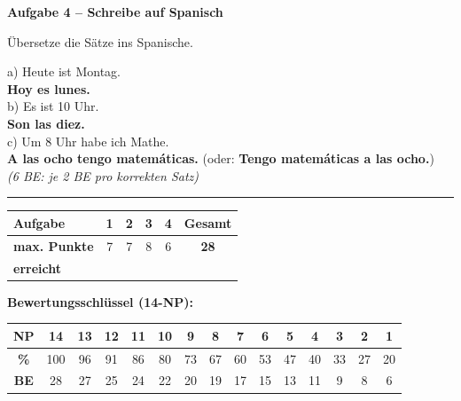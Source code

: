 \documentclass[11pt, a4paper]{article}
\newcommand{\fachfarbe}{spanisch}
\newcommand{\punktebox}[1]{\hfill\fbox{\small \_\_\_/#1}}
\newcommand{\lsg}[1]{\textcolor{loesung}{\textbf{#1}}}
\newenvironment{aufgabe}[1]{%
    \vspace{12pt}
    \noindent\textbf{\textcolor{\fachfarbe}{Aufgabe #1}}
    \vspace{6pt}
    \begin{list}{}{\leftmargin=0pt}
    \item[]
}{%
    \end{list}
}
\begin{document}
\vspace{15pt}


\begin{aufgabe}{4 -- Schreibe auf Spanisch}
Übersetze die Sätze ins Spanische. \punktebox{6}
\end{aufgabe}

\noindent
a) Heute ist Montag. \\[0.5em]
\lsg{Hoy es lunes.} \\[1em]

\noindent
b) Es ist 10 Uhr. \\[0.5em]
\lsg{Son las diez.} \\[1em]

\noindent
c) Um 8 Uhr habe ich Mathe. \\[0.5em]
\lsg{A las ocho tengo matemáticas.} (oder: \lsg{Tengo matemáticas a las ocho.}) \\

\textcolor{loesung}{\textit{(6 BE: je 2 BE pro korrekten Satz)}}


\vspace{20pt}
\hrule
\vspace{10pt}

\noindent
\begin{tabularx}{\textwidth}{|X|c|c|c|c||c|}
\hline
\textbf{Aufgabe} & 1 & 2 & 3 & 4 & \textbf{Gesamt} \\
\hline
\textbf{max. Punkte} & 7 & 7 & 8 & 6 & \textbf{28} \\
\hline
\textbf{erreicht} & & & & & \\[0.8em]
\hline
\end{tabularx}

\vspace{15pt}

\noindent\textbf{Bewertungsschlüssel (14-NP):}

\begin{center}
\begin{tabular}{|c|c|c|c|c|c|c|c|c|c|c|c|c|c|c|}
\hline
\textbf{NP} & 14 & 13 & 12 & 11 & 10 & 9 & 8 & 7 & 6 & 5 & 4 & 3 & 2 & 1 \\
\hline
\textbf{\%} & 100 & 96 & 91 & 86 & 80 & 73 & 67 & 60 & 53 & 47 & 40 & 33 & 27 & 20 \\
\hline
\textbf{BE} & 28 & 27 & 25 & 24 & 22 & 20 & 19 & 17 & 15 & 13 & 11 & 9 & 8 & 6 \\
\hline
\end{tabular}
\end{center}
\end{document}
